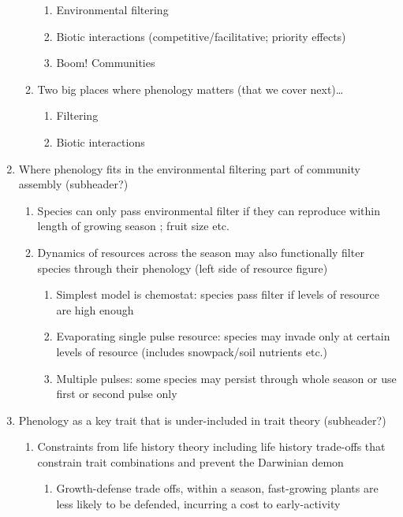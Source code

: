 \documentclass[11pt]{article}
\begin{document}
\begin{enumerate}
\begin{enumerate}
\begin{enumerate}
\item Environmental filtering
\item Biotic interactions (competitive/facilitative; priority effects)
\item Boom! Communities
\end{enumerate}
\item Two big places where phenology matters (that we cover next)…
\begin{enumerate}
\item Filtering
\item Biotic interactions
\end{enumerate}
\end{enumerate}
\item Where phenology fits in the environmental filtering part of community assembly (subheader?)
\begin{enumerate}
\item Species can only pass environmental filter if they can reproduce within length of growing season \citep[PhenoFit model predicts species range limits, see][]{Chuine:2001ab}; fruit size etc.
\item Dynamics of resources across the season may also functionally filter species through their phenology (left side of resource figure)
\begin{enumerate}
\item Simplest model is chemostat: species pass filter if levels of resource are high enough
\item Evaporating single pulse resource: species may invade only at certain levels of resource (includes snowpack/soil nutrients etc.)
\item Multiple pulses: some species may persist through whole season or use first or second pulse only
\end{enumerate}
\end{enumerate}
\item Phenology as a key trait that is under-included in trait theory (subheader?) %
\begin{enumerate}
\item Constraints from life history theory including life history trade-offs that constrain trait combinations and prevent the Darwinian demon
\begin{enumerate}
\item Growth-defense trade offs, within a season, fast-growing plants are less likely to be defended, incurring a cost to early-activity \cite{waterton2016,meineke2019}

\end{enumerate}
\end{enumerate}
\end{enumerate}
\end{document}

